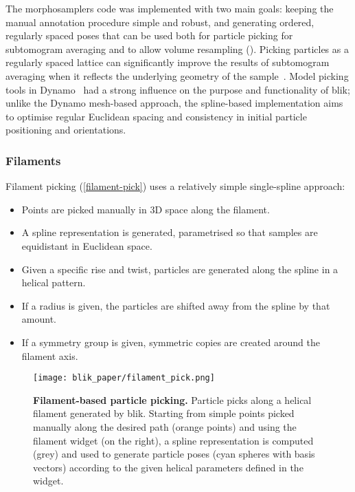 The morphosamplers code was implemented with two main goals: keeping the manual annotation procedure simple and robust, and generating ordered, regularly spaced poses that can be used both for particle picking for subtomogram averaging and to allow volume resampling (). Picking particles as a regularly spaced lattice can significantly improve the results of subtomogram averaging when it reflects the underlying geometry of the sample~\cite{castano-diezDynamoCatalogueGeometrical2017,burtFlexibleFrameworkMultiparticle2021}. Model picking tools in Dynamo~\cite{castano-diezDynamoFlexibleUserfriendly2012} had a strong influence on the purpose and functionality of blik; unlike the Dynamo mesh-based approach, the spline-based implementation aims to optimise regular Euclidean spacing and consistency in initial particle positioning and orientations.

\subsubsection{Filaments}
Filament picking (\autoref{filament-pick}) uses a relatively simple single-spline approach:

\begin{itemize}[noitemsep]
    \item Points are picked manually in 3D space along the filament.
    \item A spline representation is generated, parametrised so that samples are equidistant in Euclidean space.
    \item Given a specific rise and twist, particles are generated along the spline in a helical pattern.
    \item If a radius is given, the particles are shifted away from the spline by that amount.
    \item If a symmetry group is given, symmetric copies are created around the filament axis.
\end{itemize}

\begin{figure}[!ht]
    \centering
    \texttt{[image: blik\_paper/filament\_pick.png]}
    \caption[Filament-based particle picking]{\textbf{Filament-based particle picking.} Particle picks along a helical filament generated by blik. Starting from simple points picked manually along the desired path (orange points) and using the filament widget (on the right), a spline representation is computed (grey) and used to generate particle poses (cyan spheres with basis vectors) according to the given helical parameters defined in the widget.}
    \label{filament-pick}
\end{figure}

